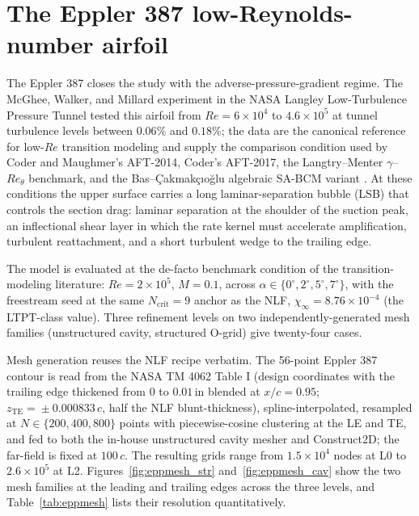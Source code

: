 \documentclass[journal]{new-aiaa}
\begin{document}
\section{The Eppler 387 low-Reynolds-number airfoil}\label{sec:eppval}

The Eppler 387 closes the study with the
adverse-pressure-gradient regime. The McGhee, Walker, and Millard experiment in
the NASA Langley Low-Turbulence Pressure Tunnel \cite{mcghee_1988} tested this
airfoil from $Re\!=\!6\!\times\!10^4$ to $4.6\!\times\!10^5$ at tunnel
turbulence levels between $0.06\%$ and $0.18\%$; the data are the canonical
reference for low-$Re$ transition modeling and supply the comparison condition
used by Coder and Maughmer's AFT-2014, Coder's AFT-2017, the Langtry--Menter
$\gamma$--$Re_\theta$ benchmark, and the Bas--{\c C}akmak{\c c}{\i}o{\u g}lu
algebraic SA-BCM variant
\cite{coder_maughmer_2014, halila_2022, langtry_menter_2009, cakmakcioglu_2018}.
At these conditions the upper surface carries a long laminar-separation bubble
(LSB) that controls the section drag: laminar separation at the shoulder of the
suction peak, an inflectional shear layer in which the rate kernel must
accelerate amplification, turbulent reattachment, and a short turbulent wedge
to the trailing edge.

The model is evaluated at the de-facto benchmark condition of the
transition-modeling literature: $Re\!=\!2\!\times\!10^5$, $M\!=\!0.1$, across
$\alpha\!\in\!\{0^\circ,2^\circ,5^\circ,7^\circ\}$, with the freestream seed at
the same $N_\mathrm{crit}\!=\!9$ anchor as the NLF,
$\chi_\infty\!=\!8.76\!\times\!10^{-4}$ (the LTPT-class value). Three
refinement levels on two independently-generated mesh families
(unstructured cavity, structured O-grid) give twenty-four cases.

Mesh generation reuses the NLF recipe verbatim. The 56-point Eppler 387
contour is read from the NASA TM 4062 Table I (design coordinates with the
trailing edge thickened from $0$ to $0.01\,\mathrm{in}$ blended at
$x/c\!=\!0.95$; $z_\mathrm{TE}\!=\!\pm0.000833\,c$, half the NLF
blunt-thickness), spline-interpolated, resampled at $N\!\in\!\{200,400,800\}$
points with piecewise-cosine clustering at the LE and TE, and fed to both the
in-house unstructured cavity mesher and Construct2D; the far-field is fixed at
$100\,c$. The resulting grids range
from $1.5\!\times\!10^4$ nodes at L0 to $2.6\!\times\!10^5$ at L2.
Figures~\ref{fig:eppmesh_str} and~\ref{fig:eppmesh_cav} show the two mesh
families at the leading and trailing edges across the three levels, and
Table~\ref{tab:eppmesh} lists their resolution quantitatively.
\end{document}
